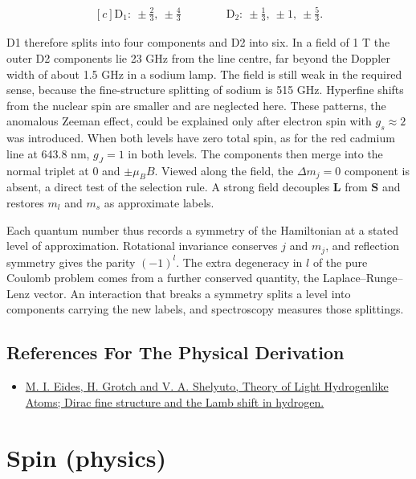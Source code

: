 \documentclass[11pt,oneside]{book}
\newenvironment{centeredalign}{\[\begin{gathered}[c]}{\end{gathered}\]}
\begin{document}
\begin{centeredalign}
\mathrm{D}_1:\ \pm\tfrac23,\ \pm\tfrac43\qquad\qquad \mathrm{D}_2:\ \pm\tfrac13,\ \pm1,\ \pm\tfrac53.
\end{centeredalign}

D1 therefore splits into four components and D2 into six. In a field of 1 T the outer D2 components lie 23 GHz from the line centre, far beyond the Doppler width of about 1.5 GHz in a sodium lamp. The field is still weak in the required sense, because the fine-structure splitting of sodium is 515 GHz. Hyperfine shifts from the nuclear spin are smaller and are neglected here. These patterns, the anomalous Zeeman effect, could be explained only after electron spin with \(g_s\approx2\) was introduced. When both levels have zero total spin, as for the red cadmium line at 643.8 nm, \(g_J=1\) in both levels. The components then merge into the normal triplet at \(0\) and \(\pm\mu_BB\). Viewed along the field, the \(\Delta m_j=0\) component is absent, a direct test of the selection rule. A strong field decouples \(\mathbf L\) from \(\mathbf S\) and restores \(m_l\) and \(m_s\) as approximate labels.

Each quantum number thus records a symmetry of the Hamiltonian at a stated level of approximation. Rotational invariance conserves \(j\) and \(m_j\), and reflection symmetry gives the parity \((-1)^l\). The extra degeneracy in \(l\) of the pure Coulomb problem comes from a further conserved quantity, the Laplace--Runge--Lenz vector. An interaction that breaks a symmetry splits a level into components carrying the new labels, and spectroscopy measures those splittings.

\subsection*{References For The Physical Derivation}
\begin{itemize}
\item \href{https://arxiv.org/abs/hep-ph/0002158}{M. I. Eides, H. Grotch and V. A. Shelyuto, Theory of Light Hydrogenlike Atoms; Dirac fine structure and the Lamb shift in hydrogen.}
\end{itemize}





\clearpage

\section{Spin (physics)}
\end{document}
